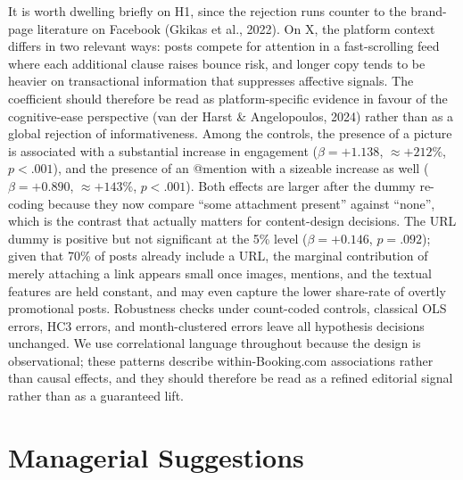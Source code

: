 \documentclass[12pt,a4paper]{article}
\begin{document}
It is worth dwelling briefly on H1, since the rejection runs counter to the brand-page literature on Facebook (Gkikas et al., 2022). On X, the platform context differs in two relevant ways: posts compete for attention in a fast-scrolling feed where each additional clause raises bounce risk, and longer copy tends to be heavier on transactional information that suppresses affective signals. The coefficient should therefore be read as platform-specific evidence in favour of the cognitive-ease perspective (van der Harst \& Angelopoulos, 2024) rather than as a global rejection of informativeness. Among the controls, the presence of a picture is associated with a substantial increase in engagement ($\beta=+1.138$, $\approx +212\%$, $p<.001$), and the presence of an @mention with a sizeable increase as well ($\beta=+0.890$, $\approx +143\%$, $p<.001$). Both effects are larger after the dummy re-coding because they now compare ``some attachment present'' against ``none'', which is the contrast that actually matters for content-design decisions. The URL dummy is positive but not significant at the 5\% level ($\beta=+0.146$, $p=.092$); given that 70\% of posts already include a URL, the marginal contribution of merely attaching a link appears small once images, mentions, and the textual features are held constant, and may even capture the lower share-rate of overtly promotional posts. Robustness checks under count-coded controls, classical OLS errors, HC3 errors, and month-clustered errors leave all hypothesis decisions unchanged. We use correlational language throughout because the design is observational; these patterns describe within-Booking.com associations rather than causal effects, and they should therefore be read as a refined editorial signal rather than as a guaranteed lift.

\section{Managerial Suggestions}
\end{document}
